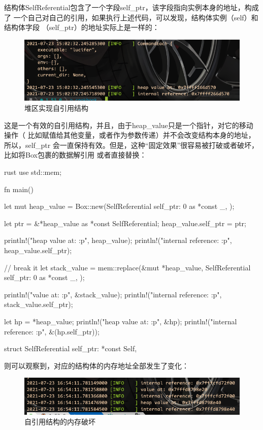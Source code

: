 结构体SelfReferential包含了一个字段self\_ptr，该字段指向实例本身的地址，构成了
一个自己对自己的引用，如果执行上述代码，可以发现，结构体实例（self）和结构体字段
（self\_ptr）的地址实际上是一样的：
\begin{figure}[H]
  \centering
  \includegraphics[width=\linewidth]{self_ref_on_heap.png}
  \caption{堆区实现自引用结构}
  \label{fig:self_ref_on_heap}
\end{figure}

这是一个有效的自引用结构，并且，由于heap\_value只是一个指针，对它的移动操作（
比如赋值给其他变量，或者作为参数传递）并不会改变结构本身的地址，所以，self\_ptr
会一直保持有效。但是，这种“固定效果”很容易被打破或者破坏，比如将Box包裹的数据解引用
或者直接替换：
\begin{code-block}{rust}
use std::mem;

fn main() {

    let mut heap_value = Box::new(SelfReferential {
        self_ptr: 0 as *const _,
    });

    let ptr = &*heap_value as *const SelfReferential;
    heap_value.self_ptr = ptr;

    println!("heap value at: {:p}", heap_value);
    println!("internal reference: {:p}", heap_value.self_ptr);

    // break it
    let stack_value = mem::replace(&mut *heap_value, SelfReferential {
        self_ptr: 0 as *const _,
    });

    println!("value at: {:p}", &stack_value);
    println!("internal reference: {:p}", stack_value.self_ptr);

    let hp = *heap_value;
    println!("heap value at: {:p}", &hp);
    println!("internal reference: {:p}", &(hp.self_ptr));
}

struct SelfReferential {
    self_ptr: *const Self,
}
\end{code-block}
则可以观察到，对应的结构体的内存地址全部发生了变化：
\begin{figure}[H]
  \centering
  \includegraphics[width=\linewidth]{self_ref_on_heap_break.png}
  \caption{自引用结构的内存破坏}
  \label{fig:self_ref_on_heap_break}
\end{figure}

